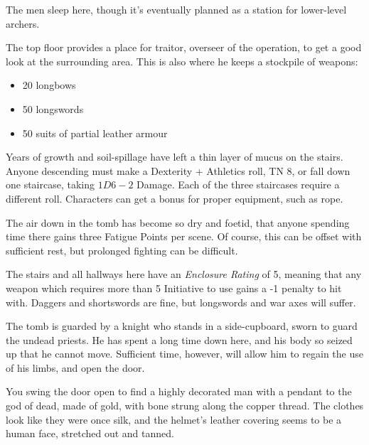 \begin{multicols}{2}

The men sleep here, though it's eventually planned as a station for lower-level archers.


The top floor provides a place for \gls{traitor}, overseer of the operation, to get a good look at the surrounding area.
This is also where he keeps a stockpile of weapons:

\begin{itemize}

	\item{20 longbows}
	\item{50 longswords}
	\item{50 suits of partial leather armour}

\end{itemize}


Years of growth and soil-spillage have left a thin layer of mucus on the stairs.
Anyone descending must make a Dexterity + Athletics roll, TN 8, or fall down one staircase, taking $1D6-2$ Damage.
Each of the three staircases require a different roll.
Characters can get a bonus for proper equipment, such as rope.

The air down in the tomb has become so dry and foetid, that anyone spending time there gains three Fatigue Points per scene.
Of course, this can be offset with sufficient rest, but prolonged fighting can be difficult.

The stairs and all hallways here have an \textit{Enclosure Rating} of 5, meaning that any weapon which requires more than 5 Initiative to use gains a -1 penalty to hit with.
Daggers and shortswords are fine, but longswords and war axes will suffer.


The tomb is guarded by a knight who stands in a side-cupboard, sworn to guard the undead priests.
He has spent a long time down here, and his body so seized up that he cannot move.
Sufficient time, however, will allow him to regain the use of his limbs, and open the door.

\begin{boxtext}

	You swing the door open to find a highly decorated man with a pendant to the god of dead, made of gold, with bone strung along the copper thread.  The clothes look like they were once silk, and the helmet's leather covering seems to be a human face, stretched out and tanned.


\end{boxtext}
\end{multicols}
